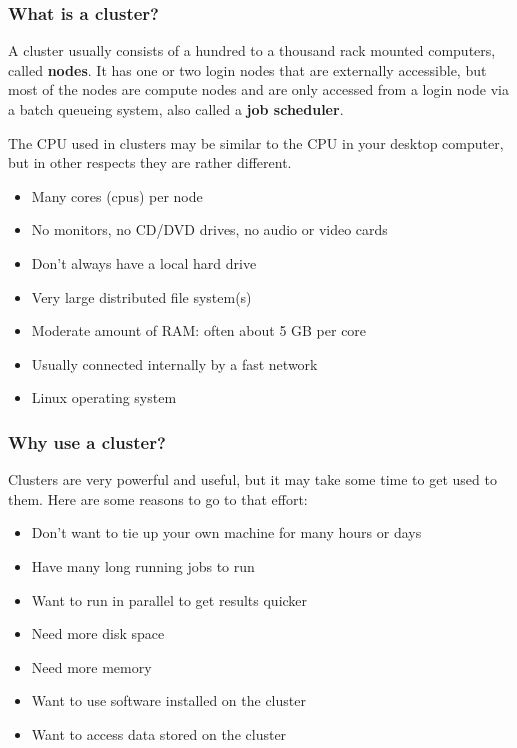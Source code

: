 \documentclass[10pt]{beamer}
\begin{document}
\begin{frame}
\frametitle{What is a cluster?}

A cluster usually consists of a hundred to a thousand rack mounted
computers, called \textbf{nodes}.  It has one or two login nodes
that are externally accessible, but most of the nodes are
compute nodes and are only accessed from a login node via a
batch queueing system, also called a \textbf{job scheduler}.

\vskip10pt
The CPU used in clusters may be similar to the CPU in your
desktop computer, but in other respects they are rather different.

\begin{itemize}
\item Many cores (cpus) per node
\item No monitors, no CD/DVD drives, no audio or video cards
\item Don't always have a local hard drive
\item Very large distributed file system(s)
\item Moderate amount of RAM: often about 5 GB per core
\item Usually connected internally by a fast network
\item Linux operating system
\end{itemize}
\end{frame}

\begin{frame}
\frametitle{Why use a cluster?}
Clusters are very powerful and useful, but it may take some
time to get used to them.
Here are some reasons to go to that effort:

\begin{itemize}
\item Don't want to tie up your own machine for many hours or days
\item Have many long running jobs to run
\item Want to run in parallel to get results quicker
\item Need more disk space
\item Need more memory
\item Want to use software installed on the cluster
\item Want to access data stored on the cluster
\end{itemize}
\end{frame}
\end{document}
